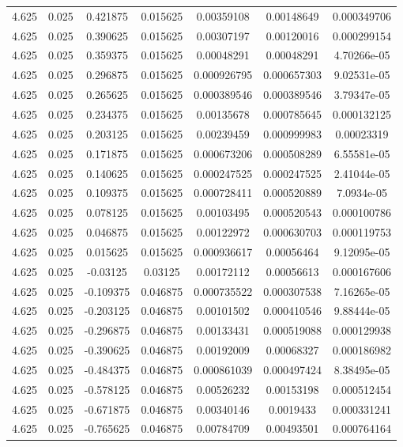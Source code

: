 \begin{flushleft}
\begin{longtable}{ccccccc}
4.625 & 0.025 & 0.421875 & 0.015625 & 0.00359108 & 0.00148649 & 0.000349706  \\ 
4.625 & 0.025 & 0.390625 & 0.015625 & 0.00307197 & 0.00120016 & 0.000299154  \\ 
4.625 & 0.025 & 0.359375 & 0.015625 & 0.00048291 & 0.00048291 & 4.70266e-05  \\ 
4.625 & 0.025 & 0.296875 & 0.015625 & 0.000926795 & 0.000657303 & 9.02531e-05  \\ 
4.625 & 0.025 & 0.265625 & 0.015625 & 0.000389546 & 0.000389546 & 3.79347e-05  \\ 
4.625 & 0.025 & 0.234375 & 0.015625 & 0.00135678 & 0.000785645 & 0.000132125  \\ 
4.625 & 0.025 & 0.203125 & 0.015625 & 0.00239459 & 0.000999983 & 0.00023319  \\ 
4.625 & 0.025 & 0.171875 & 0.015625 & 0.000673206 & 0.000508289 & 6.55581e-05  \\ 
4.625 & 0.025 & 0.140625 & 0.015625 & 0.000247525 & 0.000247525 & 2.41044e-05  \\ 
4.625 & 0.025 & 0.109375 & 0.015625 & 0.000728411 & 0.000520889 & 7.0934e-05  \\ 
4.625 & 0.025 & 0.078125 & 0.015625 & 0.00103495 & 0.000520543 & 0.000100786  \\ 
4.625 & 0.025 & 0.046875 & 0.015625 & 0.00122972 & 0.000630703 & 0.000119753  \\ 
4.625 & 0.025 & 0.015625 & 0.015625 & 0.000936617 & 0.00056464 & 9.12095e-05  \\ 
4.625 & 0.025 & -0.03125 & 0.03125 & 0.00172112 & 0.00056613 & 0.000167606  \\ 
4.625 & 0.025 & -0.109375 & 0.046875 & 0.000735522 & 0.000307538 & 7.16265e-05  \\ 
4.625 & 0.025 & -0.203125 & 0.046875 & 0.00101502 & 0.000410546 & 9.88444e-05  \\ 
4.625 & 0.025 & -0.296875 & 0.046875 & 0.00133431 & 0.000519088 & 0.000129938  \\ 
4.625 & 0.025 & -0.390625 & 0.046875 & 0.00192009 & 0.00068327 & 0.000186982  \\ 
4.625 & 0.025 & -0.484375 & 0.046875 & 0.000861039 & 0.000497424 & 8.38495e-05  \\ 
4.625 & 0.025 & -0.578125 & 0.046875 & 0.00526232 & 0.00153198 & 0.000512454  \\ 
4.625 & 0.025 & -0.671875 & 0.046875 & 0.00340146 & 0.0019433 & 0.000331241  \\ 
4.625 & 0.025 & -0.765625 & 0.046875 & 0.00784709 & 0.00493501 & 0.000764164  \\ 

\end{longtable}
\end{flushleft}
